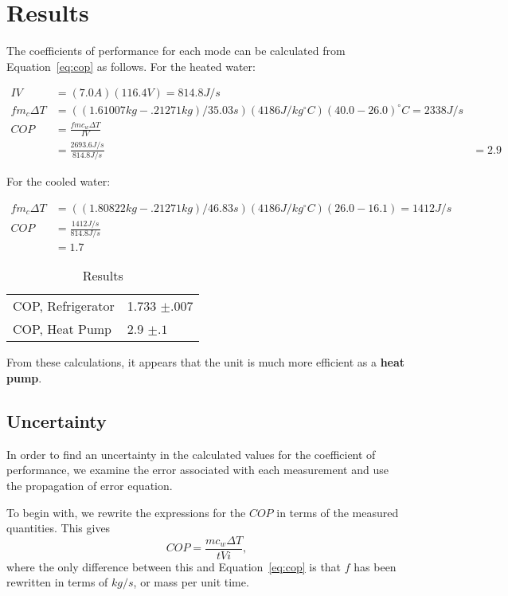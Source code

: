 \documentclass[twocolumn,english]{IEEEtran}
\theoremstyle{plain}
\theoremstyle{plain}
\begin{document}
\hrulefill

\section{Results}

The coefficients of performance for each mode can be calculated from Equation~\ref{eq:cop} as follows. For the heated water:

\begin{align*}
	IV 				&= (7.0 A)(116.4 V) = 814.8 J/s \\
	fm_c\Delta T	&= ((1.61007 kg - .21271 kg)  / 35.03 s)(4186 J/kg^{\circ}C)(40.0-26.0)^{\circ}C = 2338 J/s \\
	COP 			&= \frac{fmc_w\Delta T}{IV} \\
	&= \frac{2693.6 J/s}{814.8 J/s}
	&= 2.9
\end{align*}

For the cooled water:

\begin{align*}
	fm_c\Delta T &= ((1.80822 kg - .21271 kg) / 46.83 s)(4186 J/kg^{\circ}C)(26.0-16.1) = 1412 J/s \\
	COP &= \frac{1412 J/s}{814.8 J/s} \\
		&= 1.7
\end{align*}


\begin{table}[h]
\centering
\caption{Results}
\label{tb:results}
\begin{tabular}{@{}ll@{}}
\toprule
COP, Refrigerator & 1.733  \hfill $\pm .007$\\
COP, Heat Pump    & 2.9 \hfill $\pm .1$\\ \bottomrule
\end{tabular}
\end{table}

From these calculations, it appears that the unit is much more efficient as a \textbf{heat pump}.

\subsection{Uncertainty}

In order to find an uncertainty in the calculated values for the coefficient of performance, we examine the error associated with each measurement and use the propagation of error equation.

To begin with, we rewrite the expressions for the $COP$ in terms of the measured quantities. This gives
\begin{equation*}
	COP = \frac{mc_w\Delta T}{tVi},
\end{equation*}
where the only difference between this and Equation~\ref{eq:cop} is that $f$ has been rewritten in terms of $kg/s$, or mass per unit time.
\end{document}
